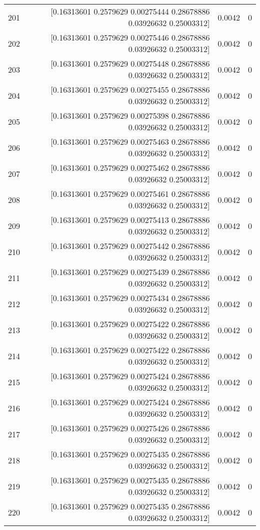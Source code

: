 \begin{longtable}{lrrr}
201 & [0.16313601 0.2579629  0.00275444 0.28678886 0.03926632 0.25003312] & 0.0042 & 0 \\
202 & [0.16313601 0.2579629  0.00275446 0.28678886 0.03926632 0.25003312] & 0.0042 & 0 \\
203 & [0.16313601 0.2579629  0.00275448 0.28678886 0.03926632 0.25003312] & 0.0042 & 0 \\
204 & [0.16313601 0.2579629  0.00275455 0.28678886 0.03926632 0.25003312] & 0.0042 & 0 \\
205 & [0.16313601 0.2579629  0.00275398 0.28678886 0.03926632 0.25003312] & 0.0042 & 0 \\
206 & [0.16313601 0.2579629  0.00275463 0.28678886 0.03926632 0.25003312] & 0.0042 & 0 \\
207 & [0.16313601 0.2579629  0.00275462 0.28678886 0.03926632 0.25003312] & 0.0042 & 0 \\
208 & [0.16313601 0.2579629  0.00275461 0.28678886 0.03926632 0.25003312] & 0.0042 & 0 \\
209 & [0.16313601 0.2579629  0.00275413 0.28678886 0.03926632 0.25003312] & 0.0042 & 0 \\
210 & [0.16313601 0.2579629  0.00275442 0.28678886 0.03926632 0.25003312] & 0.0042 & 0 \\
211 & [0.16313601 0.2579629  0.00275439 0.28678886 0.03926632 0.25003312] & 0.0042 & 0 \\
212 & [0.16313601 0.2579629  0.00275434 0.28678886 0.03926632 0.25003312] & 0.0042 & 0 \\
213 & [0.16313601 0.2579629  0.00275422 0.28678886 0.03926632 0.25003312] & 0.0042 & 0 \\
214 & [0.16313601 0.2579629  0.00275422 0.28678886 0.03926632 0.25003312] & 0.0042 & 0 \\
215 & [0.16313601 0.2579629  0.00275424 0.28678886 0.03926632 0.25003312] & 0.0042 & 0 \\
216 & [0.16313601 0.2579629  0.00275424 0.28678886 0.03926632 0.25003312] & 0.0042 & 0 \\
217 & [0.16313601 0.2579629  0.00275426 0.28678886 0.03926632 0.25003312] & 0.0042 & 0 \\
218 & [0.16313601 0.2579629  0.00275435 0.28678886 0.03926632 0.25003312] & 0.0042 & 0 \\
219 & [0.16313601 0.2579629  0.00275435 0.28678886 0.03926632 0.25003312] & 0.0042 & 0 \\
220 & [0.16313601 0.2579629  0.00275435 0.28678886 0.03926632 0.25003312] & 0.0042 & 0 \\

\end{longtable}
